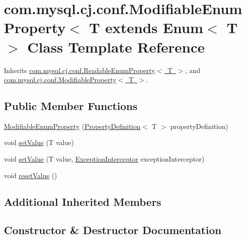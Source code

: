 \hypertarget{classcom_1_1mysql_1_1cj_1_1conf_1_1_modifiable_enum_property}{}\section{com.\+mysql.\+cj.\+conf.\+Modifiable\+Enum\+Property$<$ T extends Enum$<$ T $>$ Class Template Reference}
\label{classcom_1_1mysql_1_1cj_1_1conf_1_1_modifiable_enum_property}


Inherits \mbox{\hyperlink{classcom_1_1mysql_1_1cj_1_1conf_1_1_readable_enum_property}{com.\+mysql.\+cj.\+conf.\+Readable\+Enum\+Property$<$ T $>$}}, and \mbox{\hyperlink{interfacecom_1_1mysql_1_1cj_1_1conf_1_1_modifiable_property}{com.\+mysql.\+cj.\+conf.\+Modifiable\+Property$<$ T $>$}}.

\subsection*{Public Member Functions}
\begin{DoxyCompactItemize}
\item 
\mbox{\hyperlink{classcom_1_1mysql_1_1cj_1_1conf_1_1_modifiable_enum_property_a405f1712974b98406893ec3292cb2dd0}{Modifiable\+Enum\+Property}} (\mbox{\hyperlink{interfacecom_1_1mysql_1_1cj_1_1conf_1_1_property_definition}{Property\+Definition}}$<$ T $>$ property\+Definition)
\item 
void \mbox{\hyperlink{classcom_1_1mysql_1_1cj_1_1conf_1_1_modifiable_enum_property_a75933d467e8ce6bf8da46c21e3177e0f}{set\+Value}} (T value)
\item 
void \mbox{\hyperlink{classcom_1_1mysql_1_1cj_1_1conf_1_1_modifiable_enum_property_aeb04443d10144806024e2a28bf4942de}{set\+Value}} (T value, \mbox{\hyperlink{interfacecom_1_1mysql_1_1cj_1_1exceptions_1_1_exception_interceptor}{Exception\+Interceptor}} exception\+Interceptor)
\item 
void \mbox{\hyperlink{classcom_1_1mysql_1_1cj_1_1conf_1_1_modifiable_enum_property_a45be76d841ee45583b59419fa45526f6}{reset\+Value}} ()
\end{DoxyCompactItemize}
\subsection*{Additional Inherited Members}


\subsection{Constructor \& Destructor Documentation}
\mbox{\label{classcom_1_1mysql_1_1cj_1_1conf_1_1_modifiable_enum_property_a405f1712974b98406893ec3292cb2dd0}} 
